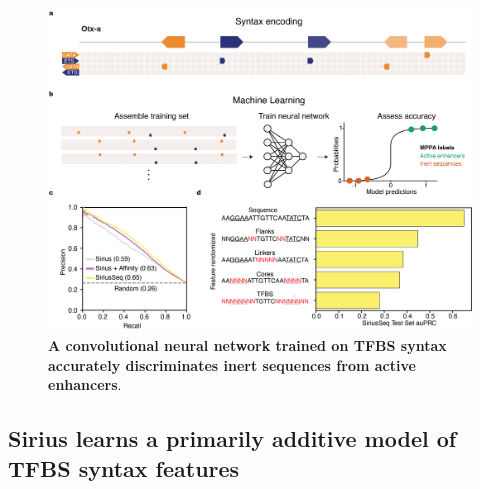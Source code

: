 \clearpage

\begin{figure}[!htbp]
    \centering
    \includegraphics[height=0.7\textheight, keepaspectratio]{2_figures-and-files/Fig2.png}
    \caption[A convolutional neural network trained on TFBS syntax accurately discriminates inert sequences from active enhancers.]{\textbf{A convolutional neural network trained on TFBS syntax accurately discriminates inert sequences from active enhancers}.}
    \label{fig:2 Figure 2}
\end{figure}

\clearpage


\subsection{Sirius learns a primarily additive model of TFBS syntax features}

